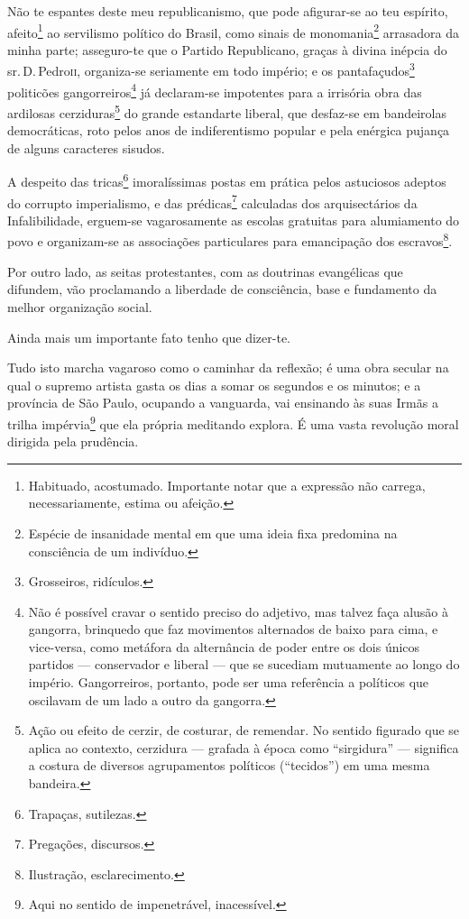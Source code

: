 Não te espantes deste meu republicanismo, que pode afigurar-se ao teu
espírito, afeito\footnote{ Habituado, acostumado. Importante notar que
  a expressão não carrega, necessariamente, estima ou afeição.} ao
servilismo político do Brasil, como sinais de {monomania}\footnote{
  Espécie de insanidade mental em que uma ideia fixa predomina na
  consciência de um indivíduo.} {arrasadora} da minha parte; asseguro-te
que o Partido Republicano, graças à divina inépcia do sr.\,D.\,Pedro\textsc{ii},
organiza-se seriamente em todo império; e os pantafaçudos\footnote{
  Grosseiros, ridículos.} politicões gangorreiros\footnote{ Não é
  possível cravar o sentido preciso do adjetivo, mas talvez faça alusão
  à gangorra, brinquedo que faz movimentos alternados de baixo para
  cima, e vice-versa, como metáfora da alternância de poder entre os
  dois únicos partidos --- conservador e liberal --- que se sucediam
  mutuamente ao longo do império. Gangorreiros, portanto, pode ser uma
  referência a políticos que oscilavam de um lado a outro da gangorra.}
já declaram-se impotentes para a irrisória obra das ardilosas
cerziduras\footnote{ Ação ou efeito de cerzir, de costurar, de
  remendar. No sentido figurado que se aplica ao contexto, cerzidura ---
  grafada à época como ``sirgidura'' --- significa a costura de diversos
  agrupamentos políticos (``tecidos'') em uma mesma bandeira.} do g{rande
estandarte liberal}, que desfaz-se em bandeirolas democráticas, roto
pelos anos de indiferentismo popular e pela enérgica pujança de alguns
caracteres sisudos.

A despeito das tricas\footnote{ Trapaças, sutilezas.} imoralíssimas
postas em prática pelos astuciosos adeptos do corrupto imperialismo, e
das prédicas\footnote{ Pregações, discursos.} calculadas dos
arquisectários da {Infalibilidade}, erguem-se vagarosamente as escolas
gratuitas para alumiamento do povo e organizam-se as associações
particulares para emancipação dos escravos\footnote{ Ilustração,
  esclarecimento.}.

Por outro lado, as seitas protestantes, com as doutrinas evangélicas que
difundem, vão proclamando a liberdade de consciência, base e fundamento
da melhor organização social.

Ainda mais um importante fato tenho que dizer-te.

Tudo isto marcha vagaroso como o caminhar da reflexão; é uma obra
secular na qual o {supremo artista} gasta os dias a somar os segundos e
os minutos; e a província de São Paulo, ocupando a vanguarda, vai
ensinando às suas Irmãs a trilha impérvia\footnote{ Aqui no sentido de
  impenetrável, inacessível.} que ela própria meditando explora. É uma
vasta revolução moral dirigida pela prudência.

